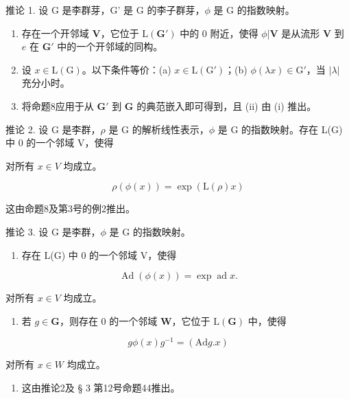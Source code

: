 推论 1. 设 G 是李群芽，G' 是 G 的李子群芽，\(\phi\) 是 G 的指数映射。

\begin{enumerate}
\def\labelenumi{(\roman{enumi})}
\item
  存在一个开邻域 \(\mathbf{V}\)，它位于 \(\mathrm{L}(\mathbf{G}')\) 中的 0 附近，使得 \(\phi | \mathbf{V}\) 是从流形 \(\mathbf{V}\) 到 \(e\) 在 \(\mathbf{G}'\) 中的一个开邻域的同构。
\item
  设 \(x \in \mathrm{L}(\mathrm{G})\)。以下条件等价：(a) \(x \in \mathrm{L}(\mathrm{G}')\)；(b) \(\phi(\lambda x) \in \mathrm{G}'\)，当 \(|\lambda|\) 充分小时。
\item
  将命题8应用于从 \(\mathbf{G}'\) 到 \(\mathbf{G}\) 的典范嵌入即可得到，且 (ii) 由 (i) 推出。
\end{enumerate}

推论 2. 设 G 是李群，\(\rho\) 是 G 的解析线性表示，\(\phi\) 是 G 的指数映射。存在 L(G) 中 0 的一个邻域 V，使得

对所有 \(x \in V\) 均成立。

\[
\rho (\phi (x)) = \exp (\mathrm{L} (\rho) x)
\]

这由命题8及第3号的例2推出。

推论 3. 设 G 是李群，\(\phi\) 是 G 的指数映射。

\begin{enumerate}
\def\labelenumi{(\roman{enumi})}
\tightlist
\item
  存在 L(G) 中 0 的一个邻域 V，使得
\end{enumerate}

\[
\operatorname{Ad} (\phi (x)) = \exp \operatorname{ad} x.
\]

对所有 \(x \in V\) 均成立。

\begin{enumerate}
\def\labelenumi{(\roman{enumi})}
\setcounter{enumi}{1}
\tightlist
\item
  若 \(g \in \mathbf{G}\)，则存在 0 的一个邻域 \(\mathbf{W}\)，它位于 \(\mathrm{L}(\mathbf{G})\) 中，使得
\end{enumerate}

\[
g \phi (x) g ^ {- 1} = (\mathrm{Ad} g. x)
\]

对所有 \(x \in W\) 均成立。

\begin{enumerate}
\def\labelenumi{(\roman{enumi})}
\tightlist
\item
  这由推论2及 § 3 第12号命题44推出。
\end{enumerate}

